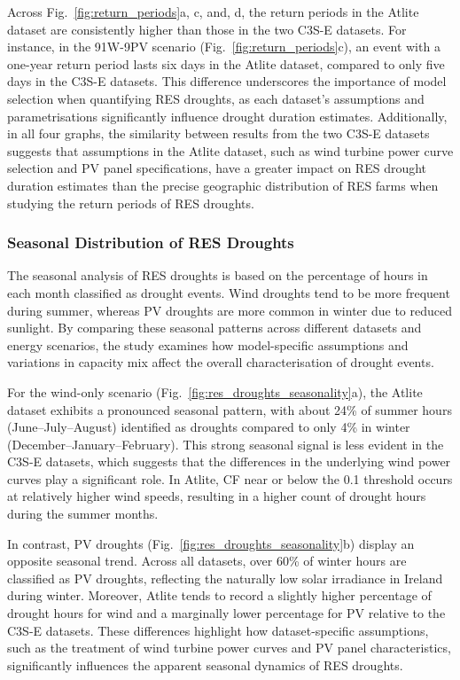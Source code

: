 \documentclass[preprint, 12pt]{elsarticle}
\begin{document}
Across Fig.~\ref{fig:return_periods}a, c, and, d, the return periods in the Atlite dataset are consistently higher than those in the two C3S-E datasets. For instance, in the 91W-9PV scenario (Fig.~\ref{fig:return_periods}c), an event with a one-year return period lasts six days in the Atlite dataset, compared to only five days in the C3S-E datasets. This difference underscores the importance of model selection when quantifying RES droughts, as each dataset’s assumptions and parametrisations significantly influence drought duration estimates. Additionally, in all four graphs, the similarity between results from the two C3S-E datasets suggests that assumptions in the Atlite dataset, such as wind turbine power curve selection and PV panel specifications, have a greater impact on RES drought duration estimates than the precise geographic distribution of RES farms when studying the return periods of RES droughts.

\subsubsection{Seasonal Distribution of RES Droughts}

The seasonal analysis of RES droughts is based on the percentage of hours in each month classified as drought events. Wind droughts tend to be more frequent during summer, whereas PV droughts are more common in winter due to reduced sunlight. By comparing these seasonal patterns across different datasets and energy scenarios, the study examines how model-specific assumptions and variations in capacity mix affect the overall characterisation of drought events.

For the wind-only scenario (Fig.~\ref{fig:res_droughts_seasonality}a), the Atlite dataset exhibits a pronounced seasonal pattern, with about 24\% of summer hours (June–July–August) identified as droughts compared to only 4\% in winter (December–January–February). This strong seasonal signal is less evident in the C3S-E datasets, which suggests that the differences in the underlying wind power curves play a significant role. In Atlite, CF near or below the 0.1 threshold occurs at relatively higher wind speeds, resulting in a higher count of drought hours during the summer months.

In contrast, PV droughts (Fig.~\ref{fig:res_droughts_seasonality}b) display an opposite seasonal trend. Across all datasets, over 60\% of winter hours are classified as PV droughts, reflecting the naturally low solar irradiance in Ireland during winter. Moreover, Atlite tends to record a slightly higher percentage of drought hours for wind and a marginally lower percentage for PV relative to the C3S-E datasets. These differences highlight how dataset-specific assumptions, such as the treatment of wind turbine power curves and PV panel characteristics, significantly influences the apparent seasonal dynamics of RES droughts.
\end{document}

